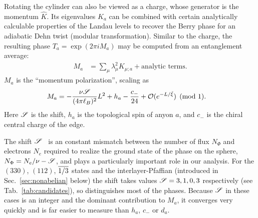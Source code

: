 Rotating the cylinder can also be viewed as a \Uone charge, whose generator is the momentum $\hat{K}$.
Its eigenvalues $K_a$ can be combined with certain analytically calculable properties of the Landau levels to recover 
the Berry phase for an adiabatic Dehn twist (modular transformation).
Similar to the charge, the resulting phase $T_a = \exp(2\pi i M_a)$ may be computed from an entanglement average:
\begin{align}
	M_a &=  \sum_\mu \lambda^2_\mu K_{\mu; a} + \textrm{analytic terms} .
\end{align}
$M_a$ is the ``momentum polarization'', scaling as \cite{ZaletelQHdmrg13,HHTuMomPol13}
\begin{align}
	M_a &= -\frac{\nu\mathscr{S}}{(4\pi\ell_B)^2}L^2 + h_a - \frac{c_-}{24} + \mathcal{O}(e^{-L / \tilde{\xi}}) \pmod{1}.
	\label{mompol}
\end{align}
Here $\mathscr{S}$ is the shift, $h_a$ is the topological spin of anyon $a$, and $c_-$ is the chiral central charge of the edge.

The shift $\mathscr{S}$~\cite{wenzee} is an constant mismatch between the number of flux $N_\Phi$ and electrons $N_e$ required to realize the ground state of the phase on the sphere, $N_\Phi= N_e / \nu - \mathscr{S}$, and plays a particularly important role in our analysis.
For the $(330)$, $(112)$,  $\overline{1/3}$ states and the interlayer-Pfaffian (introduced in Sec.~\ref{sec:nonabelian} below) the shift takes values $\mathscr{S} = 3, 1, 0, 3$ respectively (see Tab.~\ref{tab:candidates}), so distinguishes most of the phases.
Because $\mathscr{S}$ in these cases is an integer and the dominant contribution to $M_a$, it converges very quickly and is far easier to measure than $h_a$, $c_-$ or $d_a$.


